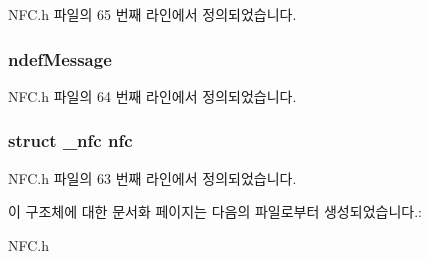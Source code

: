 N\-F\-C.\-h 파일의 65 번째 라인에서 정의되었습니다.

\hypertarget{struct_n_f_c_extends_af404558710d345372ee7a9bff25f8503}{
\subsubsection[{ndef\-Message}]{ ndef\-Message}}\label{struct_n_f_c_extends_af404558710d345372ee7a9bff25f8503}


N\-F\-C.\-h 파일의 64 번째 라인에서 정의되었습니다.

\hypertarget{struct_n_f_c_extends_acf0441e1462c7b5253838f663761996a}{
\subsubsection[{nfc}]{\setlength{\rightskip}{0pt plus 5cm}struct {\bf \-\_\-nfc} nfc}}\label{struct_n_f_c_extends_acf0441e1462c7b5253838f663761996a}


N\-F\-C.\-h 파일의 63 번째 라인에서 정의되었습니다.



이 구조체에 대한 문서화 페이지는 다음의 파일로부터 생성되었습니다.\-:\begin{DoxyCompactItemize}
\item 
N\-F\-C.\-h\end{DoxyCompactItemize}
